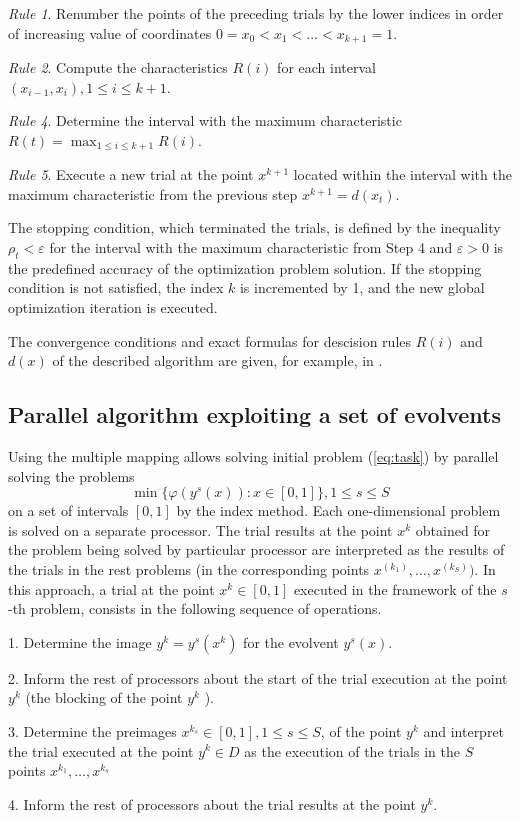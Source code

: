 \documentclass[runningheads]{llncs}
\begin{document}
\textit{Rule 1}. Renumber the points of the preceding trials by the lower indices in order of increasing value of coordinates
$0=x_0<x_1<...<x_{k+1}=1$.

\textit{Rule 2}. Compute the characteristics \(R(i)\) for each interval \((x_{i-1},x_i),1\leq i\leq k+1\).

\textit{Rule 4}. Determine the interval with the maximum characteristic $R(t)=\max_{1\leq i \leq k+1}R(i)$.

\textit{Rule 5}. Execute a new trial at the point \(x^{k+1}\) located within the interval with the maximum characteristic from the previous step
  $x^{k+1}=d(x_t)$.

The stopping condition, which terminated the trials, is defined by the inequality $\rho_t<\varepsilon$
for the interval with the maximum characteristic from Step 4 and \(\varepsilon >0\) is the predefined
accuracy of the optimization problem solution. If the stopping condition is not satisfied,
the index \(k\) is incremented by 1, and the new global optimization iteration is executed.

The convergence conditions and exact formulas for descision rules $R(i)$ and $d(x)$ of the described algorithm are given, for example, in \cite{strSergGO}.

\subsection{Parallel algorithm exploiting a set of evolvents}
\label{sec:parallel_evolvents}
Using the multiple mapping allows solving initial problem (\ref{eq:task}) by parallel solving the problems
\[
\min\{\varphi(y^s(x)):x\in [0,1]\}, 1\leqslant s\leqslant S
\]
on a set of intervals $[0,1]$ by the index method. Each one-dimensional problem is solved on a separate processor. The trial results at the point \(x^k\) obtained for the problem being solved by particular processor are interpreted as the results of the trials in the rest problems (in the corresponding points \(x^(k_1 ),\dots,x^(k_S))\). In this approach, a trial at the point \(x^k \in [0,1]\) executed in the framework of the \(s\)-th problem, consists in the following sequence of operations.
\par
1. Determine the image \(y^k=y^s (x^k)\) for the evolvent \(y^s (x)\).
\par
2. Inform the rest of processors about the start of the trial execution at the point\( y^k\) (the blocking of the point \(y^k\) ).
\par
3. Determine the preimages \(x{}^{k_s}  \in [0,1], 1≤s≤S\), of the point \(y^k\) and interpret the trial executed at the point \(y^k \in D \) as the execution of the trials in the \(S\) points \(x{}^{k_1} ,…,x{}^{k_s} \)
\par
4. Inform the rest of processors about the trial results at the point \(y^k\).
\par
\end{document}
